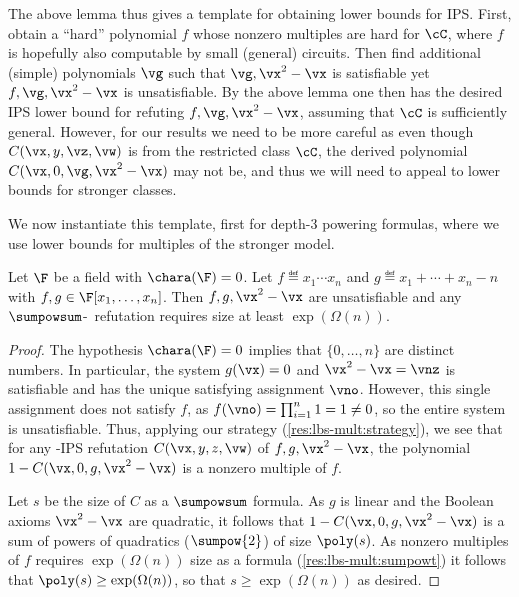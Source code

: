 \documentclass{toc}
\begin{document}
The above lemma thus gives a template for obtaining lower bounds for IPS\@.  First, obtain a ``hard'' polynomial $f$ whose nonzero multiples are hard for $\cC$, where $f$ is hopefully also computable by small (general) circuits.  Then find additional (simple) polynomials $\vg$ such that $\vg,\vx^2-\vx$ is satisfiable yet $f,\vg,\vx^2-\vx$ is unsatisfiable.  By the above lemma one then has the desired IPS lower bound for refuting $f,\vg,\vx^2-\vx$, assuming that $\cC$ is sufficiently general.  However, for our results we need to be more careful as even though $C(\vx,y,\vz,\vw)$ is from the restricted class $\cC$, the derived polynomial $C(\vx,0,\vg,\vx^2-\vx)$ may not be, and
thus %
we will need to appeal to lower bounds for stronger classes.

We now instantiate this template, first for depth-3 powering formulas, where we use lower bounds for multiples of the stronger  model.

\begin{corollary}\label{res:lbs-ips:mult:sumpowsum}
        Let $\F$ be a field with $\chara(\F)=0$.  Let $f\eqdef x_1\cdots x_n$ and $g\eqdef x_1+\cdots+x_n-n$ with $f,g\in\F[x_1,\ldots,x_n]$.  Then $f,g,\vx^2-\vx$ are unsatisfiable and any $\sumpowsum$-\IPS\ refutation requires size at least $\exp(\Omega(n))$.
\end{corollary}
\begin{proof}
        The hypothesis $\chara(\F)=0$ implies that $\{0,\ldots,n\}$ are distinct numbers.  In particular, the system $g(\vx)=0$ and $\vx^2-\vx=\vnz$ is satisfiable and has the unique satisfying assignment $\vno$.  However, this single assignment does not satisfy $f$, %
        as $f(\vno)=\prod_{i=1}^n 1=1\ne 0$, so the entire system is unsatisfiable.  Thus, applying our strategy (\autoref{res:lbs-mult:strategy}), we see that for any \sumpowsum-IPS refutation $C(\vx,y,z,\vw)$ of $f,g,\vx^2-\vx$,
%
the polynomial %
$1-C(\vx,0,g,\vx^2-\vx)$ is a nonzero multiple of $f$.

        Let $s$ be the size of $C$ as a $\sumpowsum$ formula.  As $g$ is linear and the Boolean axioms $\vx^2-\vx$ are quadratic, it follows that $1-C(\vx,0,g,\vx^2-\vx)$ is a sum of powers of quadratics ($\sumpow{2}$) of size $\poly(s)$.  As nonzero multiples of $f$ requires
%
$\exp(\Omega(n))$ size    %
as a  formula (\autoref{res:lbs-mult:sumpowt}) it follows that $\poly(s)\ge\exp(\Omega(n))$, so that $s\ge\exp(\Omega(n))$ as desired.
\end{proof}
\end{document}

